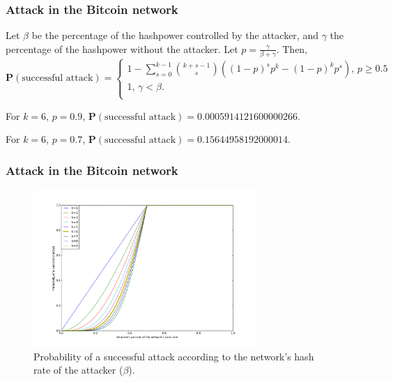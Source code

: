 \documentclass{beamer}
\begin{document}
\begin{frame}
\frametitle{Attack in the Bitcoin network}

\begin{theorem}
	Let $\beta$ be the percentage of the hashpower controlled by the attacker, and $\gamma$ the percentage of the hashpower without the attacker. Let $p = \frac{\gamma}{\beta + \gamma}$. Then,
$$
\mathbf{P}(\text{successful attack}) =
\begin{cases}
	1 - \sum_{s=0}^{k-1} \binom{k+s-1}{s} \left( (1-p)^s p^k - (1-p)^k p^s \right) \text{, $p \geq 0.5$} \\
	1 \text{, $\gamma < \beta$}.\\
\end{cases}
$$
\end{theorem}

For $k=6$, $p=0.9$, $\mathbf{P}(\text{successful attack}) = 0.0005914121600000266$.

For $k=6$, $p=0.7$, $\mathbf{P}(\text{successful attack}) = 0.15644958192000014$.

\end{frame}


\begin{frame}
\frametitle{Attack in the Bitcoin network}
\begin{figure}
\includegraphics[width=0.75\textwidth]{./images01/fig-bitcoin-attack.png}
\caption{Probability of a successful attack according to the network's hash rate of the attacker ($\beta$).}
\end{figure}
\end{frame}
\end{document}
